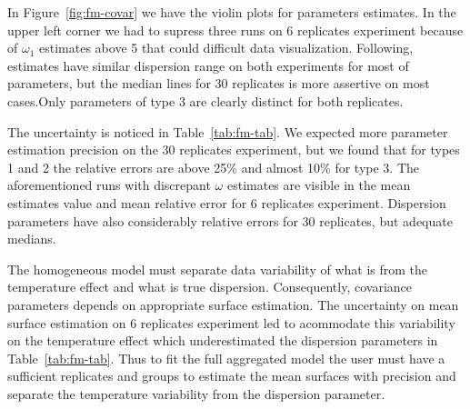 In Figure~\ref{fig:fm-covar} we have the violin plots for parameters estimates. In the  upper left corner we had to supress three runs on 6 replicates experiment because of $\omega_1$ estimates above 5 that could difficult data visualization. Following, estimates have similar dispersion range on both experiments for most of parameters, but the median lines for 30 replicates is more assertive on most cases.Only parameters of type 3 are clearly distinct for both replicates.

The uncertainty is noticed in Table~\ref{tab:fm-tab}. We expected more parameter estimation precision on the 30 replicates experiment, but we found that for types 1 and 2 the relative errors are above 25\% and almost 10\% for type 3. The aforementioned runs with discrepant $\omega$ estimates are visible in the mean estimates value and mean relative error for 6 replicates experiment. Dispersion parameters have also considerably relative errors for 30 replicates, but adequate medians.


The homogeneous model must separate data variability of what is from the temperature effect and what is true dispersion. Consequently, covariance parameters depends on appropriate surface estimation. The uncertainty on mean surface estimation on 6 replicates experiment led to acommodate this variability on the temperature effect which underestimated the dispersion parameters in Table~\ref{tab:fm-tab}. Thus to fit the full aggregated model the user must have a sufficient replicates and groups to estimate the mean surfaces with precision and separate the temperature variability from the dispersion parameter.



